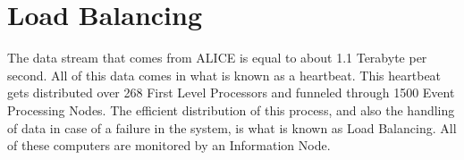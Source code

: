 \section{Load Balancing}
The data stream that comes from ALICE is equal to about 1.1 Terabyte per second. All of this data comes in what is known as a heartbeat. This heartbeat gets distributed over 268 First Level Processors and funneled through	1500 Event Processing Nodes. The efficient distribution of this process, and also the handling of data in case of a failure in the system, is what is known as Load Balancing. All of these computers are monitored by an Information Node.